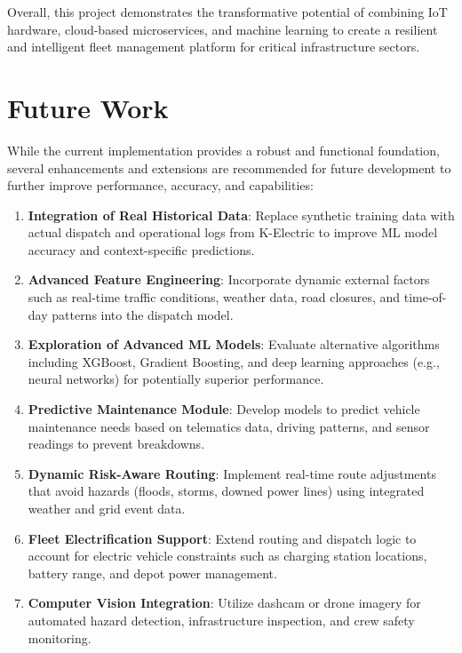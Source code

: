 Overall, this project demonstrates the transformative potential of combining IoT hardware, cloud-based microservices, and machine learning to create a resilient and intelligent fleet management platform for critical infrastructure sectors.

\section{Future Work}

While the current implementation provides a robust and functional foundation, several enhancements and extensions are recommended for future development to further improve performance, accuracy, and capabilities:

\begin{enumerate}
    \item \textbf{Integration of Real Historical Data}: Replace synthetic training data with actual dispatch and operational logs from K-Electric to improve ML model accuracy and context-specific predictions.
    
    \item \textbf{Advanced Feature Engineering}: Incorporate dynamic external factors such as real-time traffic conditions, weather data, road closures, and time-of-day patterns into the dispatch model.
    
    \item \textbf{Exploration of Advanced ML Models}: Evaluate alternative algorithms including XGBoost, Gradient Boosting, and deep learning approaches (e.g., neural networks) for potentially superior performance.
    
    \item \textbf{Predictive Maintenance Module}: Develop models to predict vehicle maintenance needs based on telematics data, driving patterns, and sensor readings to prevent breakdowns.
    
    \item \textbf{Dynamic Risk-Aware Routing}: Implement real-time route adjustments that avoid hazards (floods, storms, downed power lines) using integrated weather and grid event data.
    
    \item \textbf{Fleet Electrification Support}: Extend routing and dispatch logic to account for electric vehicle constraints such as charging station locations, battery range, and depot power management.
    
    \item \textbf{Computer Vision Integration}: Utilize dashcam or drone imagery for automated hazard detection, infrastructure inspection, and crew safety monitoring.
    

\end{enumerate}
